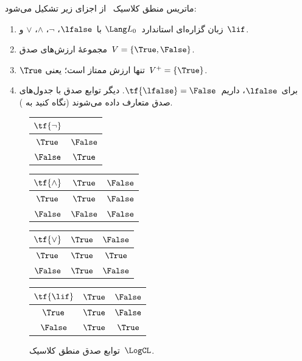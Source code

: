 \documentclass[../../../include/open-logic-section]{subfiles}
\begin{document}
\begin{ex}
ماتریس منطق کلاسیک~\LogCL{} از اجزای زیر تشکیل می‌شود:
\begin{enumerate}
  \item زبان گزاره‌ای استاندارد~$\Lang L_0$ با~$\lfalse$، $\lnot$،
  $\land$، $\lor$ و~$\lif$.
  \item مجموعهٔ ارزش‌های صدق~$V = \{\True, \False\}$.
  \item $\True$ تنها ارزش ممتاز است؛ یعنی~$V^+ = \{\True\}$.
  \item برای~$\lfalse$، داریم~$\tf{\lfalse} = \False$. دیگر توابع صدق
  با جدول‌های صدق متعارف داده می‌شوند (نگاه کنید به
  ).
\end{enumerate}
\begin{figure}
  \begin{center}
      \begin{tabular}{c|c} 
        $\tf{\lnot}$ & \\ 
        \hline  
        $\True$ & $\False$ \\ 
        $\False$ & $\True$ 
      \end{tabular}
      \quad
      \begin{tabular}{c|cc} 
        $\tf{\land}$ & $\True$ & $\False$ \\ 
        \hline 
        $\True$ & $\True$ & $\False$ \\ 
        $\False$ & $\False$ & $\False$ 
      \end{tabular}
      \quad
      \begin{tabular}{c|cc} 
        $\tf{\lor}$ & $\True$ & $\False$ \\ 
        \hline 
        $\True$ & $\True$ & $\True$ \\ 
        $\False$ & $\True$ & $\False$ 
      \end{tabular}
      \quad
      \begin{tabular}{c|cc} 
        $\tf{\lif}$ & $\True$ & $\False$ \\ 
        \hline 
        $\True$ & $\True$ & $\False$ \\ 
        $\False$ & $\True$ & $\True$ 
      \end{tabular}
    \end{center} 
    \caption{توابع صدق منطق کلاسیک~$\LogCL$.}
  \end{figure}
  \end{ex}
\end{document}

